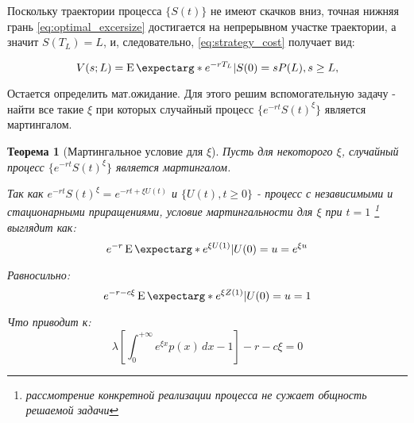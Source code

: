 \documentclass[a4paper,12pt]{article}
\newtheorem{theorem}{Теорема}
\theoremstyle{definition}
\newcommand{\expect}{\operatorname{E}\expectarg}
\begin{document}
Поскольку траектории процесса $\{S(t)\}$ не имеют скачков вниз, точная нижняя грань \eqref{eq:optimal_excersize} достигается на непрерывном участке траектории, а значит $S(T_L) = L$, и, следовательно, \eqref{eq:strategy_cost} получает вид:

\begin{equation}\label{eq:strategy_c1}
V(s; L) = \expect*{e^{-rT_L} | S(0) = s} P(L), s \ge L,
\end{equation}

Остается определить мат.ожидание. Для этого решим вспомогательную задачу - найти все такие $\xi$ при которых случайный процесс $\{e^{-rt}S(t)^{\xi}\}$ является мартингалом.
\begin{theorem}[Мартингальное условие для $\xi$]\label{thm:martingale_cond_for_xi}
Пусть для некоторого $\xi$, случайный процесс $\{e^{-rt}S(t)^{\xi}\}$ является мартингалом. 

Так как $e^{-rt}S(t)^{\xi} = e^{-rt + \xi U(t)}$ и $\{U(t), t \ge 0\}$ - процесс с независимыми и стационарными приращениями, условие мартингальности для $\xi$ при $t = 1$ \footnote{рассмотрение конкретной реализации процесса не сужает общность решаемой задачи} выглядит как:
\begin{equation}\label{eq:martingale_cond_for_xi}
e^{-r} \expect*{e^{\xi U(1)}|U(0) = u} = e ^ {\xi u}
\end{equation}

Равносильно:
\begin{equation}\label{eq:martingale_cond_for_xi_alt}
e^{-r - c\xi} \expect*{e^{\xi Z(1)}|U(0) = u} = 1
\end{equation}

Что приводит к:
\begin{equation}\label{eq:martingale_cond_for_xi_log}
\lambda \left[ \int_{0}^{+\infty} e^{\xi x} p(x) \,dx - 1  \right] - r - c \xi
 = 0
\end{equation}

\end{theorem}
\end{document}
